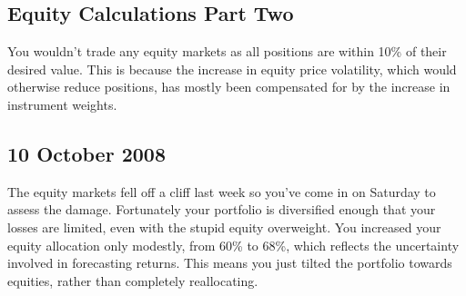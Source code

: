 \subsection*{Equity Calculations Part Two}


You wouldn't trade any equity markets as all positions are within 10\% of their desired value. This is because the increase in equity price volatility, which would otherwise reduce positions, has mostly been compensated for by the increase in instrument weights.

\subsection*{10 October 2008}

The equity markets fell off a cliff last week so you've come in on Saturday to assess the damage. Fortunately your portfolio is diversified enough that your losses are limited, even with the stupid equity overweight. You increased your equity allocation only modestly, from 60\% to 68\%, which reflects the uncertainty involved in forecasting returns. This means you just tilted the portfolio towards equities, rather than completely reallocating.

